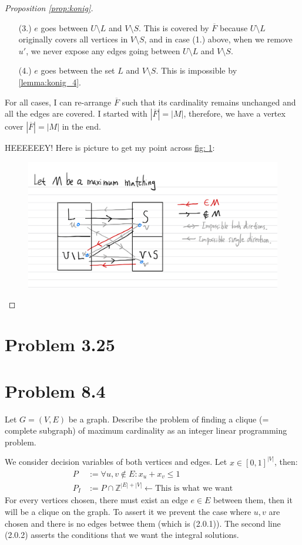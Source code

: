 \documentclass[]{article}
\theoremstyle{definition}
\begin{document}
\begin{proof}[Proposition \ref*{prop:konig}]
\begin{enumerate}
            \item [(3.)] $e$ goes between $U\setminus L$ and $V\setminus S$. This is covered by $\overline F$ because $U\setminus L$ originally covers all vertices in $V\setminus S$, and in case (1.) above, when we remove $u'$, we never expose any edges going between $U\setminus L$ and $V\setminus S$. 
            \item [(4.)] $e$ goes between the set $L$ and $V\setminus S$. This is impossible by \hyperref[lemma:konig_4]{\ref*{lemma:konig_4}}. 
        \end{enumerate}
        For all cases, I can re-arrange $\overline F$ such that its cardinality remains unchanged and all the edges are covered. I started with $|\overline F| = |M|$, therefore, we have a vertex cover $|\overline{F}| = |M|$ in the end. 
        \par
        HEEEEEEY! Here is picture to get my point across \hyperref[fig:1]{fig: \ref*{fig:1}}:
        \begin{figure}[h]\label{fig:1}
            \centering
            \includegraphics[width=12cm]{fig1.jpeg}
        \end{figure}
    \end{proof}

\section{Problem 3.25}


\section{Problem 8.4}
    Let $G = (V, E)$ be a graph. Describe the problem of finding a clique (= complete subgraph) of maximum cardinality as an integer linear programming problem. 
    \par
    We consider decision variables of both vertices and edges. Let $x\in [0, 1]^{|V|}$, then: 
    \begin{align}
        P & := \forall {u, v}\not \in E: 
                x_u + x_v \le 1
        \\
        P_I &:= P \cap \mathbb Z^{|E| + |V|} \leftarrow \text{This is what we want}
    \end{align}
    For every vertices chosen, there must exist an edge $e\in E$ between them, then it will be a clique on the graph. To assert it we prevent the case where $u, v$ are chosen and there is no edges betwee them (which is (2.0.1)). The second line (2.0.2) asserts the conditions that we want the integral solutions. 
\end{document}
